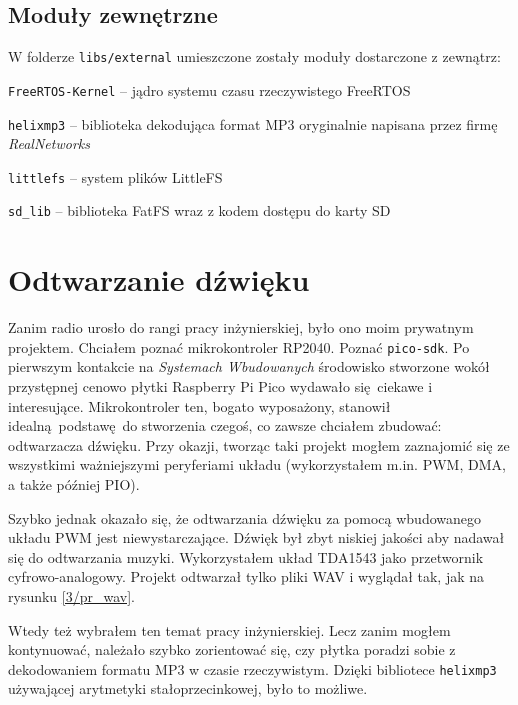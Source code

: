\documentclass[12pt]{report}
\let\tempone\itemize
\let\temptwo\enditemize
\renewenvironment{itemize}{\tempone\setlength{\itemsep}{0cm}}{\temptwo}
\begin{document}
	\subsection{Moduły zewnętrzne}
	W folderze \lstinline|libs/external| umieszczone zostały moduły dostarczone z zewnątrz:
	\begin{itemize}
		\item \lstinline|FreeRTOS-Kernel| -- jądro systemu czasu rzeczywistego FreeRTOS\textsuperscript{\cite{freertos_kernel}}
		\item \lstinline|helixmp3| -- biblioteka dekodująca format MP3\textsuperscript{\cite{helixmp3_repo}} oryginalnie napisana przez firmę \textit{RealNetworks}\textsuperscript{\cite{realnetworks}}
		\item \lstinline|littlefs| -- system plików LittleFS\textsuperscript{\cite{littlefs}}
		\item \lstinline|sd_lib| -- biblioteka FatFS\textsuperscript{\cite{fatfs}} wraz z kodem dostępu do karty SD\textsuperscript{\cite{sdfs}}
	\end{itemize}

	\section{Odtwarzanie dźwięku}
	Zanim radio urosło do rangi pracy inżynierskiej, było ono moim prywatnym projektem. Chciałem poznać mikrokontroler RP2040. Poznać \lstinline|pico-sdk|. Po pierwszym kontakcie na \textit{Systemach Wbudowanych} środowisko stworzone wokół przystępnej cenowo płytki Raspberry Pi Pico wydawało się ciekawe i interesujące. Mikrokontroler ten, bogato wyposażony, stanowił idealną podstawę do stworzenia czegoś, co zawsze chciałem zbudować: odtwarzacza dźwięku. Przy okazji, tworząc taki projekt mogłem zaznajomić się ze wszystkimi ważniejszymi peryferiami układu (wykorzystałem m.in. PWM, DMA, a także później PIO).
	
	Szybko jednak okazało się, że odtwarzania dźwięku za pomocą wbudowanego układu PWM jest niewystarczające. Dźwięk był zbyt niskiej jakości aby nadawał się do odtwarzania muzyki. Wykorzystałem układ TDA1543 jako przetwornik cyfrowo-analogowy. Projekt odtwarzał tylko pliki WAV i wyglądał tak, jak na rysunku \ref{3/pr_wav}.
	
	Wtedy też wybrałem ten temat pracy inżynierskiej. Lecz zanim mogłem kontynuować, należało szybko zorientować się, czy płytka poradzi sobie z dekodowaniem formatu MP3 w czasie rzeczywistym. Dzięki bibliotece \lstinline|helixmp3| używającej arytmetyki stałoprzecinkowej, było to możliwe.
	
\end{document}
